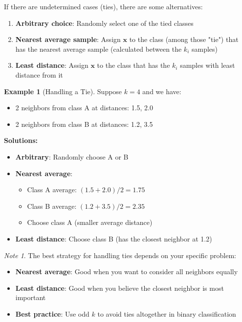 \documentclass[11pt,a4paper]{article}
\theoremstyle{definition}
\newtheorem{example}{Example}[section]
\theoremstyle{plain}
\theoremstyle{remark}
\newtheorem*{remark}{Note}
\begin{document}
If there are undetermined cases (ties), there are some alternatives:

\begin{enumerate}
    \item \textbf{Arbitrary choice}: Randomly select one of the tied classes
    
    \item \textbf{Nearest average sample}: Assign $\mathbf{x}$ to the class (among those "tie") that has the nearest average sample (calculated between the $k_i$ samples)
    
    \item \textbf{Least distance}: Assign $\mathbf{x}$ to the class that has the $k_i$ samples with least distance from it
\end{enumerate}

\begin{example}[Handling a Tie]
Suppose $k=4$ and we have:
\begin{itemize}
    \item 2 neighbors from class A at distances: 1.5, 2.0
    \item 2 neighbors from class B at distances: 1.2, 3.5
\end{itemize}

\textbf{Solutions:}
\begin{itemize}
    \item \textbf{Arbitrary}: Randomly choose A or B
    \item \textbf{Nearest average}: 
    \begin{itemize}
        \item Class A average: $(1.5 + 2.0)/2 = 1.75$
        \item Class B average: $(1.2 + 3.5)/2 = 2.35$
        \item Choose class A (smaller average distance)
    \end{itemize}
    \item \textbf{Least distance}: Choose class B (has the closest neighbor at 1.2)
\end{itemize}
\end{example}

\begin{remark}
The best strategy for handling ties depends on your specific problem:
\begin{itemize}
    \item \textbf{Nearest average}: Good when you want to consider all neighbors equally
    \item \textbf{Least distance}: Good when you believe the closest neighbor is most important
    \item \textbf{Best practice}: Use odd $k$ to avoid ties altogether in binary classification
\end{itemize}
\end{remark}
\end{document}
